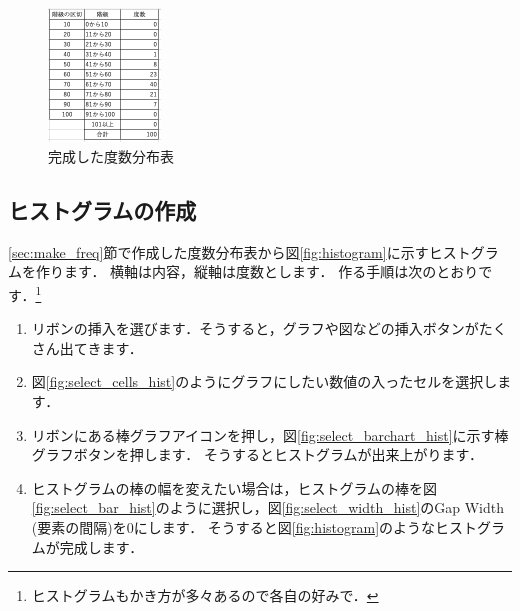 \begin{figure}[htbp]
    \centering
    \includegraphics[width=3cm]{chap1/freq.png}
    \caption{完成した度数分布表}
    \label{fig:freq}
\end{figure}

\subsection{ヒストグラムの作成}

\ref{sec:make_freq}節で作成した度数分布表から図\ref{fig:histogram}に示すヒストグラムを作ります．
横軸は内容，縦軸は度数とします．
作る手順は次のとおりです．\footnote{ヒストグラムもかき方が多々あるので各自の好みで．}

\begin{enumerate}
    \item リボンの挿入を選びます．そうすると，グラフや図などの挿入ボタンがたくさん出てきます．
    \item 図\ref{fig:select_cells_hist}のようにグラフにしたい数値の入ったセルを選択します．
    \item リボンにある棒グラフアイコンを押し，図\ref{fig:select_barchart_hist}に示す棒グラフボタンを押します．
    そうするとヒストグラムが出来上がります．
    \item ヒストグラムの棒の幅を変えたい場合は，ヒストグラムの棒を図\ref{fig:select_bar_hist}のように選択し，図\ref{fig:select_width_hist}のGap Width (要素の間隔)を0にします．
    そうすると図\ref{fig:histogram}のようなヒストグラムが完成します．
\end{enumerate}

